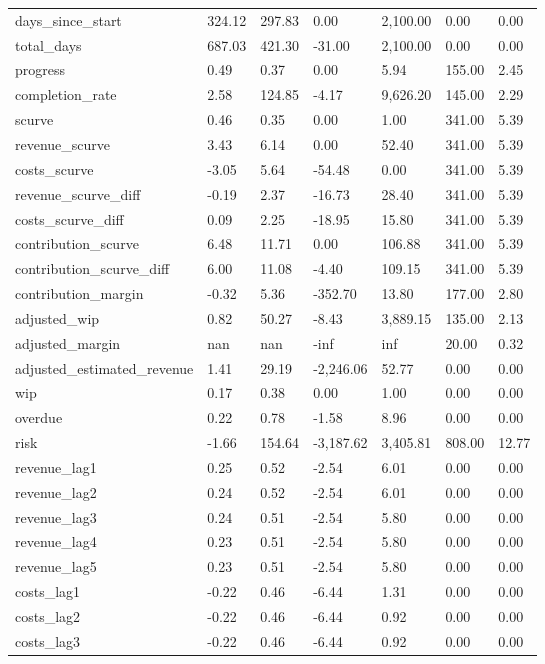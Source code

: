 \begin{landscape}
\begin{longtable}[h!]{lllllll}
days_since_start & 324.12 & 297.83 & 0.00 & 2,100.00 & 0.00 & 0.00 \\
total_days & 687.03 & 421.30 & -31.00 & 2,100.00 & 0.00 & 0.00 \\
progress & 0.49 & 0.37 & 0.00 & 5.94 & 155.00 & 2.45 \\
completion_rate & 2.58 & 124.85 & -4.17 & 9,626.20 & 145.00 & 2.29 \\
scurve & 0.46 & 0.35 & 0.00 & 1.00 & 341.00 & 5.39 \\
revenue_scurve & 3.43 & 6.14 & 0.00 & 52.40 & 341.00 & 5.39 \\
costs_scurve & -3.05 & 5.64 & -54.48 & 0.00 & 341.00 & 5.39 \\
revenue_scurve_diff & -0.19 & 2.37 & -16.73 & 28.40 & 341.00 & 5.39 \\
costs_scurve_diff & 0.09 & 2.25 & -18.95 & 15.80 & 341.00 & 5.39 \\
contribution_scurve & 6.48 & 11.71 & 0.00 & 106.88 & 341.00 & 5.39 \\
contribution_scurve_diff & 6.00 & 11.08 & -4.40 & 109.15 & 341.00 & 5.39 \\
contribution_margin & -0.32 & 5.36 & -352.70 & 13.80 & 177.00 & 2.80 \\
adjusted_wip & 0.82 & 50.27 & -8.43 & 3,889.15 & 135.00 & 2.13 \\
adjusted_margin & nan & nan & -inf & inf & 20.00 & 0.32 \\
adjusted_estimated_revenue & 1.41 & 29.19 & -2,246.06 & 52.77 & 0.00 & 0.00 \\
wip & 0.17 & 0.38 & 0.00 & 1.00 & 0.00 & 0.00 \\
overdue & 0.22 & 0.78 & -1.58 & 8.96 & 0.00 & 0.00 \\
risk & -1.66 & 154.64 & -3,187.62 & 3,405.81 & 808.00 & 12.77 \\
revenue_lag1 & 0.25 & 0.52 & -2.54 & 6.01 & 0.00 & 0.00 \\
revenue_lag2 & 0.24 & 0.52 & -2.54 & 6.01 & 0.00 & 0.00 \\
revenue_lag3 & 0.24 & 0.51 & -2.54 & 5.80 & 0.00 & 0.00 \\
revenue_lag4 & 0.23 & 0.51 & -2.54 & 5.80 & 0.00 & 0.00 \\
revenue_lag5 & 0.23 & 0.51 & -2.54 & 5.80 & 0.00 & 0.00 \\
costs_lag1 & -0.22 & 0.46 & -6.44 & 1.31 & 0.00 & 0.00 \\
costs_lag2 & -0.22 & 0.46 & -6.44 & 0.92 & 0.00 & 0.00 \\
costs_lag3 & -0.22 & 0.46 & -6.44 & 0.92 & 0.00 & 0.00 \\

\end{longtable}
\end{landscape}
